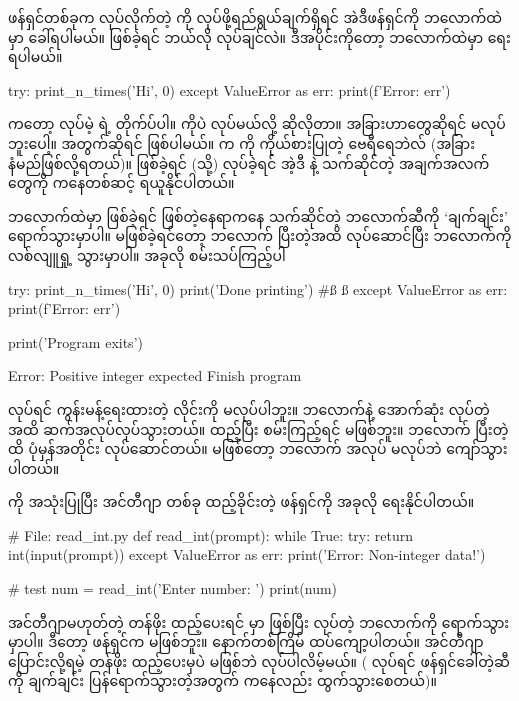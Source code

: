 ဖန်ရှင်တစ်ခုက  လုပ်လိုက်တဲ့  ကို  လုပ်ဖို့ရည်ရွယ်ချက်ရှိရင် အဲဒီဖန်ရှင်ကို   ဘလောက်ထဲမှာ ခေါ်ရပါမယ်။  ဖြစ်ခဲ့ရင် ဘယ်လို  လုပ်ချင်လဲ။ ဒီအပိုင်းကိုတော့  ဘလောက်ထဲမှာ ရေးရပါမယ်။
%
\begin{py}
try:
    print_n_times('Hi', 0)
except ValueError as err:
    print(f'Error: {err}')
\end{py}
%
 ကတော့  လုပ်မဲ့  ရဲ့ တိုက်ပ်ပါ။    ကိုပဲ  လုပ်မယ်လို့ ဆိုလိုတာ။ အခြားဟာတွေဆိုရင်  မလုပ်ဘူးပေါ့။  အတွက်ဆိုရင်  ဖြစ်ပါမယ်။   က  ကို ကိုယ်စားပြုတဲ့  ဗေရီရေဘဲလ် (အခြား နံမည်ဖြစ်လို့ရတယ်)။  ဖြစ်ခဲ့ရင် (သို့)  လုပ်ခဲ့ရင် အဲ့ဒီ   နဲ့ သက်ဆိုင်တဲ့ အချက်အလက်တွေကို   ကနေတစ်ဆင့် ရယူနိုင်ပါတယ်။ 

 ဘလောက်ထဲမှာ  ဖြစ်ခဲ့ရင် ဖြစ်တဲ့နေရာကနေ သက်ဆိုင်တဲ့  ဘလောက်ဆီကို ‘ချက်ချင်း’ ရောက်သွားမှာပါ။ မဖြစ်ခဲ့ရင်တော့  ဘလောက် ပြီးတဲ့အထိ လုပ်ဆောင်ပြီး  ဘလောက်ကို လစ်လျူရှု့ သွားမှာပါ။ အခုလို စမ်းသပ်ကြည့်ပါ
%
\begin{py}
try:
    print_n_times('Hi', 0)
    print('Done printing') #ß  ß
except ValueError as err:
    print(f'Error: {err}')

print('Program exits')
\end{py}
{}
\begin{codetxt}
Error: Positive integer expected
Finish program
\end{codetxt}
 လုပ်ရင် ကွန်းမန့်ရေးထားတဲ့ လိုင်းကို မလုပ်ပါဘူး။  ဘလောက်နဲ့ အောက်ဆုံး  လုပ်တဲ့အထိ ဆက်အလုပ်လုပ်သွားတယ်။  ထည့်ပြီး စမ်းကြည့်ရင်  မဖြစ်ဘူး။  ဘလောက် ပြီးတဲ့ထိ ပုံမှန်အတိုင်း လုပ်ဆောင်တယ်။  မဖြစ်တော့  ဘလောက် အလုပ် မလုပ်ဘဲ ကျော်သွားပါတယ်။

 ကို အသုံးပြုပြီး အင်တီဂျာ တစ်ခု  ထည့်ခိုင်းတဲ့ ဖန်ရှင်ကို အခုလို ရေးနိုင်ပါတယ်။
%
\begin{py}
# File: read_int.py
def read_int(prompt):
    while True:
        try:
            return int(input(prompt))
        except ValueError as err:
            print('Error: Non-integer data!')

# test 
num = read_int('Enter number: ')
print(num)
\end{py}
%
အင်တီဂျာမဟုတ်တဲ့ တန်ဖိုး ထည့်ပေးရင်  မှာ   ဖြစ်ပြီး  လုပ်တဲ့ ဘလောက်ကို ရောက်သွားမှာပါ။ ဒီတော့ ဖန်ရှင်က  မဖြစ်ဘူး။   နောက်တစ်ကြိမ် ထပ်ကျော့ပါတယ်။ အင်တီဂျာ ပြောင်းလို့ရမဲ့ တန်ဖိုး ထည့်ပေးမှပဲ  မဖြစ်ဘဲ   လုပ်ပါလိမ့်မယ်။ ( လုပ်ရင် ဖန်ရှင်ခေါ်တဲ့ဆီကို ချက်ချင်း ပြန်ရောက်သွားတဲ့အတွက်  ကနေလည်း ထွက်သွားစေတယ်)။ 

